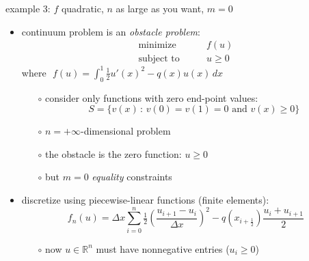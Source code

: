 \documentclass[10pt,hyperref,dvipsnames]{beamer}
\newcommand{\RR}{\mathbb{R}}
\newcommand{\ds}{\displaystyle}
\begin{document}
\begin{frame}{example 3: $f$ quadratic, $n$ as large as you want, $m=0$}

\begin{itemize}
\item continuum problem is an \emph{obstacle problem}:
\begin{equation*}
\begin{matrix}
\text{minimize} \qquad & f(u) \\
\text{subject to} \qquad & u \ge 0
\end{matrix}
\end{equation*}
where \,\,$\ds f(u) = \int_0^1 \tfrac{1}{2} u'(x)^2 - q(x) u(x)\,dx$

    \begin{itemize}
    \item[$\circ$] consider only functions with zero end-point values:
    	$$S = \{v(x)\,:\, v(0)=v(1)=0 \text{ and } v(x) \ge 0\}$$
    \item[$\circ$] $n=+\infty$-dimensional problem
    \item[$\circ$] the obstacle is the zero function: $u\ge 0$
    \item[$\circ$] but $m=0$ \emph{equality} constraints
    \end{itemize}
\item discretize using piecewise-linear functions (finite elements):
\begin{equation*}
    f_n(u) = \Delta x \sum_{i=0}^n \tfrac{1}{2}\left(\frac{u_{i+1}-u_i}{\Delta x}\right)^2 - q(x_{i+\frac{1}{2}}) \frac{u_i + u_{i+1}}{2}
\end{equation*}

    \begin{itemize}
    \item[$\circ$] now $u\in\RR^n$ must have nonnegative entries ($u_i\ge 0$)
    \end{itemize}
\end{itemize}
\end{frame}
\end{document}
